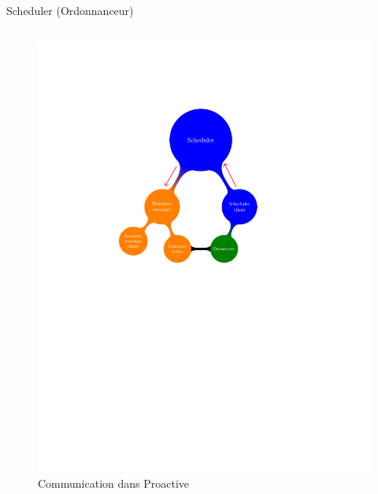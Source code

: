 \documentclass{beamer}
\begin{document}
\begin{frame}{Scheduler (Ordonnanceur)}
\begin{columns}
\begin{column}[l]{0.5\linewidth}
{\begin{figure}
            \includegraphics[trim=4cm 13cm 2cm 5cm,scale=0.48]{submit.pdf}
            \caption{Communication dans Proactive}
        \end{figure}}
\end{column}
\end{columns}
\end{frame}
\end{document}
